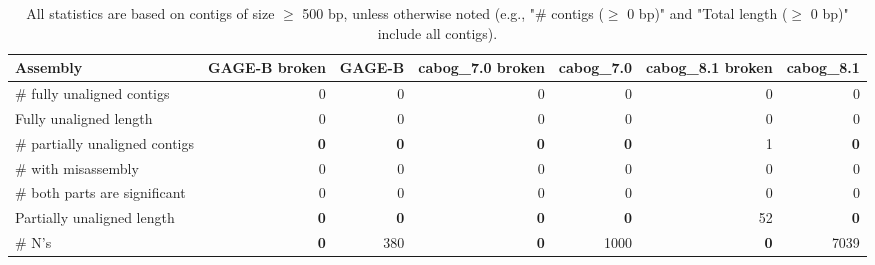 \documentclass[12pt,a4paper]{article}
\begin{document}
\begin{table}[ht]
\begin{center}
\caption{All statistics are based on contigs of size $\geq$ 500 bp, unless otherwise noted (e.g., "\# contigs ($\geq$ 0 bp)" and "Total length ($\geq$ 0 bp)" include all contigs).}
\begin{tabular}{|l*{6}{|r}|}
\hline
Assembly & GAGE-B broken & GAGE-B & cabog\_7.0 broken & cabog\_7.0 & cabog\_8.1 broken & cabog\_8.1 \\ \hline
\# fully unaligned contigs & 0 & 0 & 0 & 0 & 0 & 0 \\ \hline
Fully unaligned length & 0 & 0 & 0 & 0 & 0 & 0 \\ \hline
\# partially unaligned contigs & {\bf 0} & {\bf 0} & {\bf 0} & {\bf 0} & 1 & {\bf 0} \\ \hline
\hspace{5mm}\# with misassembly & 0 & 0 & 0 & 0 & 0 & 0 \\ \hline
\hspace{5mm}\# both parts are significant & 0 & 0 & 0 & 0 & 0 & 0 \\ \hline
Partially unaligned length & {\bf 0} & {\bf 0} & {\bf 0} & {\bf 0} & 52 & {\bf 0} \\ \hline
\# N's & {\bf 0} & 380 & {\bf 0} & 1000 & {\bf 0} & 7039 \\ \hline
\end{tabular}
\end{center}
\end{table}
\end{document}
